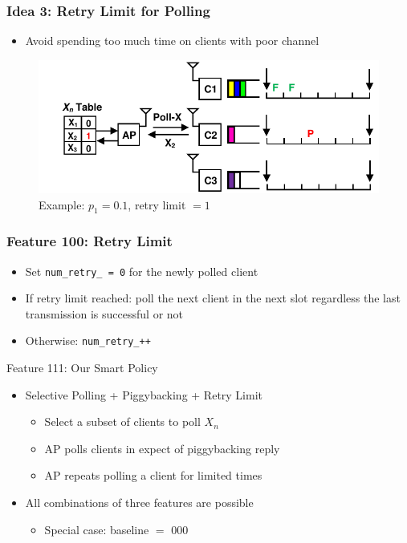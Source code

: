 \documentclass{beamer}
\begin{document}
\begin{frame}
\frametitle{Idea 3: Retry Limit for Polling}
\begin{itemize}
\item Avoid spending too much time on clients with poor channel
\end{itemize}
\begin{figure}
\centering
\includegraphics[scale=0.8]{retry_1.pdf}
\caption{Example: $p_1=0.1$, retry limit $= 1$}
\end{figure}
\end{frame}

\begin{frame}
\frametitle{Feature 100: Retry Limit}
\begin{itemize}
  \item Set \lstinline|num_retry_ = 0| for the newly polled client
  \item If retry limit reached: poll the next client in the next slot
    regardless the last transmission is successful or not
  \item Otherwise: \lstinline|num_retry_++|
\end{itemize}
\end{frame}

\begin{frame}{Feature 111: Our Smart Policy}
  \begin{itemize}
    \item Selective Polling + Piggybacking + Retry Limit
      \begin{itemize}
	\item Select a subset of clients to poll $X_n$
	\item AP polls clients in expect of piggybacking reply
	\item AP repeats polling a client for limited times
      \end{itemize}
    \item All combinations of three features are possible
      \begin{itemize}
	\item Special case: baseline $=$ 000
      \end{itemize}
  \end{itemize}
\end{frame}
\end{document}
